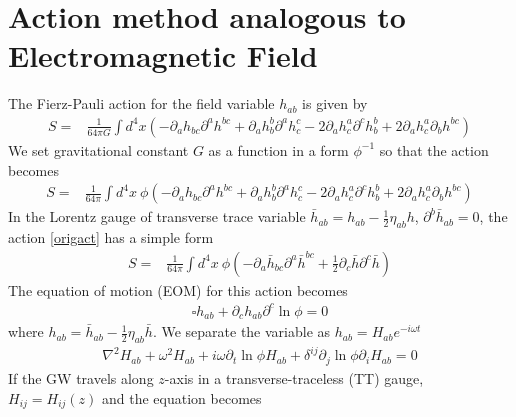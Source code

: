 \documentclass[
 jor,
 amsmath,amssymb,preprint,
]{revtex4-2}
\begin{document}
\section{Action method analogous to Electromagnetic Field}
The Fierz-Pauli action for the field variable $h_{ab}$ is given by~\cite{roy2020probing}
\begin{equation}
\begin{aligned}
S = & \frac{1}{64 \pi G} \int d^4 x\left(-\partial_a h_{b c} \partial^a h^{b c}+\partial_a h_b^b \partial^a h_c^c-2 \partial_a h_c^a \partial^c h_b^b+2 \partial_a h_c^a \partial_b h^{b c}\right)
\end{aligned}
\end{equation}
We set gravitational constant $G$ as a function in a form $\phi^{-1}$ so that the action becomes
\begin{equation}
\begin{aligned}
S = & \frac{1}{64 \pi} \int d^4 x~\phi\left(-\partial_a h_{b c} \partial^a h^{b c}+\partial_a h_b^b \partial^a h_c^c-2 \partial_a h_c^a \partial^c h_b^b+2 \partial_a h_c^a \partial_b h^{b c}\right) \label{origact}
\end{aligned}
\end{equation}
In the Lorentz gauge of transverse trace variable $\bar{h}_{ab} = h_{ab} - \frac{1}{2}\eta_{ab}h$, $\partial^b \bar{h}_{ab} = 0$, the action \eqref{origact} has a simple form
\begin{equation}
\begin{aligned}
S = & \frac{1}{64 \pi} \int d^4 x~\phi \left( -\partial_a\bar{h}_{bc}\partial^a\bar{h}^{bc} + \frac{1}{2}\partial_c\bar{h}\partial^c\bar{h} \right)
\end{aligned}
\end{equation}
The equation of motion (EOM) for this action becomes
\begin{align}
\square h_{ab} + \partial_ch_{ab}\partial^c\ln\phi = 0 \label{fereom}
\end{align}
where $h_{ab} = \bar{h}_{ab} - \frac{1}{2} \eta_{ab}\bar{h}$. We separate the variable as $h_{ab} = H_{ab}e^{-i\omega t}$
\begin{equation}
\begin{aligned}
\nabla^2 H_{ab} + \omega^2 H_{ab} + i\omega \partial_t\ln \phi H_{ab} + \delta^{ij} \partial_j\ln \phi \partial_iH_{ab} = 0
\end{aligned}
\end{equation}
If the GW travels along $z$-axis in a transverse-traceless (TT) gauge, $H_{ij} = H_{ij}(z)$ and the equation becomes
\end{document}
